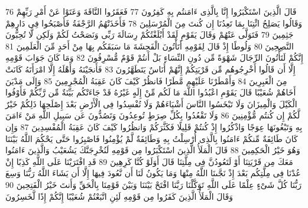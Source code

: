 \documentclass[20pt,a4paper]{article}
\begin{document}
{\tiny\colorbox{cl_aya}{76}} قَالَ الَّذِينَ اسْتَكْبَرُوا إِنَّا بِالَّذِى ءَامَنتُم بِهِ كَفِرُونَ
{\tiny\colorbox{cl_aya}{77}} فَعَقَرُوا النَّاقَةَ وَعَتَوْا عَنْ أَمْرِ رَبِّهِمْ وَقَالُوا يَصَلِحُ ائْتِنَا بِمَا تَعِدُنَا إِن كُنتَ مِنَ الْمُرْسَلِينَ
{\tiny\colorbox{cl_aya}{78}} فَأَخَذَتْهُمُ الرَّجْفَةُ فَأَصْبَحُوا فِى دَارِهِمْ جَثِمِينَ
{\tiny\colorbox{cl_aya}{79}} فَتَوَلَّى عَنْهُمْ وَقَالَ يَقَوْمِ لَقَدْ أَبْلَغْتُكُمْ رِسَالَةَ رَبِّى وَنَصَحْتُ لَكُمْ وَلَكِن لَّا تُحِبُّونَ النَّصِحِينَ
{\tiny\colorbox{cl_aya}{80}} وَلُوطًا إِذْ قَالَ لِقَوْمِهِ أَتَأْتُونَ الْفَحِشَةَ مَا سَبَقَكُم بِهَا مِنْ أَحَدٍ مِّنَ الْعَلَمِينَ
{\tiny\colorbox{cl_aya}{81}} إِنَّكُمْ لَتَأْتُونَ الرِّجَالَ شَهْوَةً مِّن دُونِ النِّسَاءِ بَلْ أَنتُمْ قَوْمٌ مُّسْرِفُونَ
{\tiny\colorbox{cl_aya}{82}} وَمَا كَانَ جَوَابَ قَوْمِهِ إِلَّا أَن قَالُوا أَخْرِجُوهُم مِّن قَرْيَتِكُمْ إِنَّهُمْ أُنَاسٌ يَتَطَهَّرُونَ
{\tiny\colorbox{cl_aya}{83}} فَأَنجَيْنَهُ وَأَهْلَهُ إِلَّا امْرَأَتَهُ كَانَتْ مِنَ الْغَبِرِينَ
{\tiny\colorbox{cl_aya}{84}} وَأَمْطَرْنَا عَلَيْهِم مَّطَرًا فَانظُرْ كَيْفَ كَانَ عَقِبَةُ الْمُجْرِمِينَ
{\tiny\colorbox{cl_aya}{85}} وَإِلَى مَدْيَنَ أَخَاهُمْ شُعَيْبًا قَالَ يَقَوْمِ اعْبُدُوا اللَّهَ مَا لَكُم مِّنْ إِلَهٍ غَيْرُهُ قَدْ جَاءَتْكُم بَيِّنَةٌ مِّن رَّبِّكُمْ فَأَوْفُوا الْكَيْلَ وَالْمِيزَانَ وَلَا تَبْخَسُوا النَّاسَ أَشْيَاءَهُمْ وَلَا تُفْسِدُوا فِى الْأَرْضِ بَعْدَ إِصْلَحِهَا ذَلِكُمْ خَيْرٌ لَّكُمْ إِن كُنتُم مُّؤْمِنِينَ
{\tiny\colorbox{cl_aya}{86}} وَلَا تَقْعُدُوا بِكُلِّ صِرَطٍ تُوعِدُونَ وَتَصُدُّونَ عَن سَبِيلِ اللَّهِ مَنْ ءَامَنَ بِهِ وَتَبْغُونَهَا عِوَجًا وَاذْكُرُوا إِذْ كُنتُمْ قَلِيلًا فَكَثَّرَكُمْ وَانظُرُوا كَيْفَ كَانَ عَقِبَةُ الْمُفْسِدِينَ
{\tiny\colorbox{cl_aya}{87}} وَإِن كَانَ طَائِفَةٌ مِّنكُمْ ءَامَنُوا بِالَّذِى أُرْسِلْتُ بِهِ وَطَائِفَةٌ لَّمْ يُؤْمِنُوا فَاصْبِرُوا حَتَّى يَحْكُمَ اللَّهُ بَيْنَنَا وَهُوَ خَيْرُ الْحَكِمِينَ
{\tiny\colorbox{cl_aya}{88}} قَالَ الْمَلَأُ الَّذِينَ اسْتَكْبَرُوا مِن قَوْمِهِ لَنُخْرِجَنَّكَ يَشُعَيْبُ وَالَّذِينَ ءَامَنُوا مَعَكَ مِن قَرْيَتِنَا أَوْ لَتَعُودُنَّ فِى مِلَّتِنَا قَالَ أَوَلَوْ كُنَّا كَرِهِينَ
{\tiny\colorbox{cl_aya}{89}} قَدِ افْتَرَيْنَا عَلَى اللَّهِ كَذِبًا إِنْ عُدْنَا فِى مِلَّتِكُم بَعْدَ إِذْ نَجَّىنَا اللَّهُ مِنْهَا وَمَا يَكُونُ لَنَا أَن نَّعُودَ فِيهَا إِلَّا أَن يَشَاءَ اللَّهُ رَبُّنَا وَسِعَ رَبُّنَا كُلَّ شَىْءٍ عِلْمًا عَلَى اللَّهِ تَوَكَّلْنَا رَبَّنَا افْتَحْ بَيْنَنَا وَبَيْنَ قَوْمِنَا بِالْحَقِّ وَأَنتَ خَيْرُ الْفَتِحِينَ
{\tiny\colorbox{cl_aya}{90}} وَقَالَ الْمَلَأُ الَّذِينَ كَفَرُوا مِن قَوْمِهِ لَئِنِ اتَّبَعْتُمْ شُعَيْبًا إِنَّكُمْ إِذًا لَّخَسِرُونَ
\end{document}
